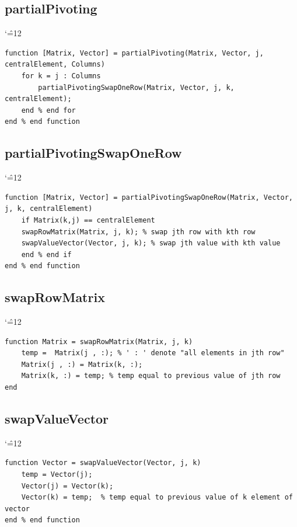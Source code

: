 \documentclass[12pt]{report}
\newenvironment{simplechar}{%
   \catcode`\^=12
}{}
\begin{document}
\subsection{partialPivoting}
\begin{simplechar}
\begin{lstlisting}
function [Matrix, Vector] = partialPivoting(Matrix, Vector, j, centralElement, Columns)
    for k = j : Columns
        partialPivotingSwapOneRow(Matrix, Vector, j, k, centralElement);
    end % end for
end % end function
\end{lstlisting}
\end{simplechar}

\subsection{partialPivotingSwapOneRow}
\begin{simplechar}
\begin{lstlisting}
function [Matrix, Vector] = partialPivotingSwapOneRow(Matrix, Vector, j, k, centralElement)
    if Matrix(k,j) == centralElement
    swapRowMatrix(Matrix, j, k); % swap jth row with kth row
    swapValueVector(Vector, j, k); % swap jth value with kth value
    end % end if
end % end function
\end{lstlisting}
\end{simplechar}


\subsection{swapRowMatrix}
\begin{simplechar}
\begin{lstlisting}
function Matrix = swapRowMatrix(Matrix, j, k)
    temp =  Matrix(j , :); % ' : ' denote "all elements in jth row"
    Matrix(j , :) = Matrix(k, :);
    Matrix(k, :) = temp; % temp equal to previous value of jth row
end
\end{lstlisting}
\end{simplechar}

\subsection{swapValueVector}
\begin{simplechar}
\begin{lstlisting}
function Vector = swapValueVector(Vector, j, k)
    temp = Vector(j);
    Vector(j) = Vector(k);
    Vector(k) = temp;  % temp equal to previous value of k element of vector
end % end function
\end{lstlisting}
\end{simplechar}
\end{document}
